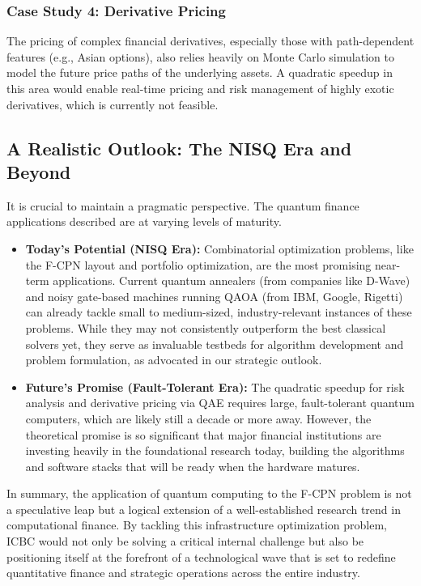 \documentclass[11pt,a4paper]{article}
\begin{document}
\subsubsection{Case Study 4: Derivative Pricing}

The pricing of complex financial derivatives, especially those with path-dependent features (e.g., Asian options), also relies heavily on Monte Carlo simulation to model the future price paths of the underlying assets. A quadratic speedup in this area would enable real-time pricing and risk management of highly exotic derivatives, which is currently not feasible.

\subsection{A Realistic Outlook: The NISQ Era and Beyond}

It is crucial to maintain a pragmatic perspective. The quantum finance applications described are at varying levels of maturity.

\begin{itemize}
    \item \textbf{Today's Potential (NISQ Era):} Combinatorial optimization problems, like the F-CPN layout and portfolio optimization, are the most promising near-term applications. Current quantum annealers (from companies like D-Wave) and noisy gate-based machines running QAOA (from IBM, Google, Rigetti) can already tackle small to medium-sized, industry-relevant instances of these problems. While they may not consistently outperform the best classical solvers yet, they serve as invaluable testbeds for algorithm development and problem formulation, as advocated in our strategic outlook.
    \item \textbf{Future's Promise (Fault-Tolerant Era):} The quadratic speedup for risk analysis and derivative pricing via QAE requires large, fault-tolerant quantum computers, which are likely still a decade or more away. However, the theoretical promise is so significant that major financial institutions are investing heavily in the foundational research today, building the algorithms and software stacks that will be ready when the hardware matures.
\end{itemize}

In summary, the application of quantum computing to the F-CPN problem is not a speculative leap but a logical extension of a well-established research trend in computational finance. By tackling this infrastructure optimization problem, ICBC would not only be solving a critical internal challenge but also be positioning itself at the forefront of a technological wave that is set to redefine quantitative finance and strategic operations across the entire industry.
\end{document}
